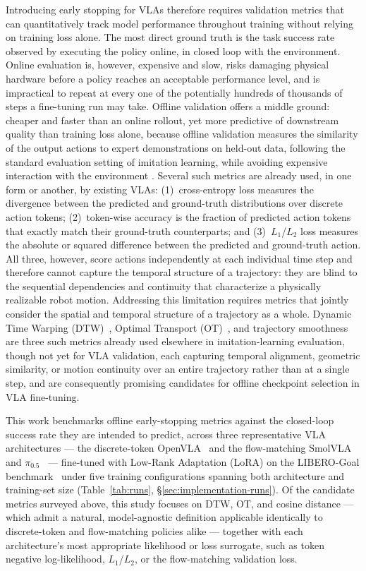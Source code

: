 \documentclass[english,12pt,a4paper,pdftex,elec,utf8]{aaltothesis}
\begin{document}
Introducing early stopping for VLAs therefore requires validation metrics that can quantitatively track
model performance throughout training without relying on training loss alone. The most direct ground
truth is the task success rate observed by executing the policy online, in closed loop with the
environment. Online evaluation is, however, expensive and slow, risks damaging physical hardware before a
policy reaches an acceptable performance level, and is impractical to repeat at every one of the
potentially hundreds of thousands of steps a fine-tuning run may take. Offline validation offers a
middle ground: cheaper and faster than an online rollout, yet more predictive of downstream quality than
training loss alone, because offline validation measures the similarity of the output actions to expert demonstrations on held-out data, following the standard evaluation setting of imitation learning, while avoiding expensive interaction with the environment \cite{il}. Several such metrics are already used, in
one form or another, by existing VLAs: (1)~cross-entropy loss measures the divergence between the
predicted and ground-truth distributions over discrete action tokens; (2)~token-wise accuracy is
the fraction of predicted action tokens that exactly match their ground-truth counterparts; and
(3)~$L_1$/$L_2$ loss measures the absolute or squared difference between the predicted and
ground-truth action. All three, however, score actions independently at each individual time step and therefore cannot capture the temporal structure of
a trajectory: they are blind to the sequential dependencies and continuity that characterize a physically
realizable robot motion. Addressing this limitation requires metrics that jointly consider the spatial and
temporal structure of a trajectory as a whole. Dynamic Time Warping (DTW)~\cite{dtw_il}, Optimal Transport
(OT)~\cite{ot_il}, and trajectory smoothness~\cite{smoothness_il} are three such metrics already used
elsewhere in imitation-learning evaluation, though not yet for VLA validation, each capturing temporal alignment, geometric similarity, or
motion continuity over an entire trajectory rather than at a single step, and are consequently promising candidates for offline checkpoint
selection in VLA fine-tuning. 

This work benchmarks offline early-stopping metrics against the closed-loop success rate they are intended to predict, across three representative VLA architectures --- the discrete-token OpenVLA~\cite{kim2024openvla} and the flow-matching SmolVLA~\cite{shukor2025smolvla} and $\pi_{0.5}$~\cite{intelligence2025pi05} --- fine-tuned with Low-Rank Adaptation (LoRA) on the LIBERO-Goal benchmark~\cite{liu2023libero} under five training configurations spanning both architecture and training-set size (Table~\ref{tab:runs}, \S\ref{sec:implementation-runs}). Of the candidate metrics surveyed above, this study focuses on DTW, OT, and cosine distance --- which admit a natural, model-agnostic definition applicable identically to discrete-token and flow-matching policies alike --- together with each architecture's most appropriate likelihood or loss surrogate, such as token negative log-likelihood, $L_1$/$L_2$, or the flow-matching validation loss. 
\end{document}
